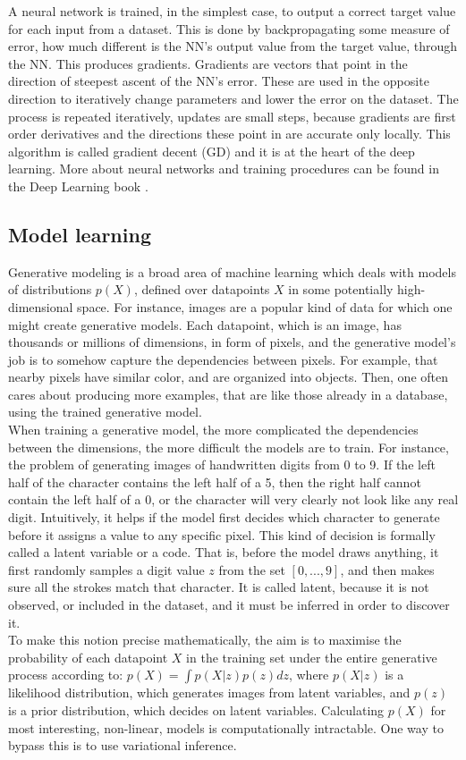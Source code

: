 A neural network is trained, in the simplest case, to output a correct target value for each input from a dataset. This is done by backpropagating some measure of error, how much different is the NN's output value from the target value, through the NN. This produces gradients. Gradients are vectors that point in the direction of steepest ascent of the NN's error. These are used in the opposite direction to iteratively change parameters and lower the error on the dataset. The process is repeated iteratively, updates are small steps, because gradients are first order derivatives and the directions these point in are accurate only locally. This algorithm is called gradient decent (GD) and it is at the heart of the deep learning. More about neural networks and training procedures can be found in the Deep Learning book \cite{Book.DeepLearning}.

\subsection{Model learning} \label{Sec.ModelLearning}

Generative modeling is a broad area of machine learning which deals with models of distributions $p(X)$, defined over datapoints $X$ in some potentially high-dimensional space. For instance, images are a popular kind of data for which one might create generative models. Each datapoint, which is an image, has thousands or millions of dimensions, in form of pixels, and the generative model’s job is to somehow capture the dependencies between pixels. For example, that nearby pixels have similar color, and are organized into objects. Then, one often cares about producing more examples, that are like those already in a database, using the trained generative model. \\
When training a generative model, the more complicated the dependencies between the dimensions, the more difficult the models are to train. For instance, the problem of generating images of handwritten digits from 0 to 9. If the left half of the character contains the left half of a 5, then the right half cannot contain the left half of a 0, or the character will very clearly not look like any real digit. Intuitively, it helps if the model first decides which character to generate before it assigns a value to any specific pixel. This kind of decision is formally called a latent variable or a code. That is, before the model draws anything, it first randomly samples a digit value $z$ from the set $[0, ..., 9]$, and then makes sure all the strokes match that character. It is called latent, because it is not observed, or included in the dataset, and it must be inferred in order to discover it. \\
To make this notion precise mathematically, the aim is to maximise the probability of each datapoint $X$ in the training set under the entire generative process according to: $p(X) = \int p(X|z)p(z)dz$, where $p(X|z)$ is a likelihood distribution, which generates images from latent variables, and $p(z)$ is a prior distribution, which decides on latent variables. Calculating $p(X)$ for most interesting, non-linear, models is computationally intractable. One way to bypass this is to use variational inference.

